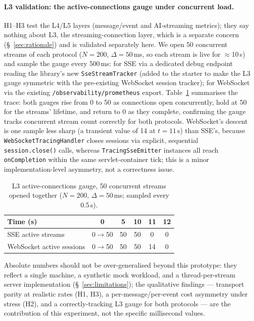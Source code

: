 \documentclass[11pt]{article}
\begin{document}
\paragraph{L3 validation: the active-connections gauge under concurrent load.} H1--H3 test the L4/L5 layers (message/event and AI-streaming metrics); they say nothing about L3, the streaming-connection layer, which is a separate concern (\S~\ref{sec:rationale}) and is validated separately here. We open 50 concurrent streams of each protocol ($N=200$, $\Delta=50$\,ms, so each stream is live for $\approx$10\,s) and sample the gauge every 500\,ms: for SSE via a dedicated debug endpoint reading the library's new \texttt{SseStreamTracker} (added to the starter to make the L3 gauge symmetric with the pre-existing WebSocket session tracker); for WebSocket via the existing \texttt{/observability/prometheus} export. Table~\ref{tab:l3-gauge} summarises the trace: both gauges rise from 0 to 50 as connections open concurrently, hold at 50 for the streams' lifetime, and return to 0 as they complete, confirming the gauge tracks concurrent stream count correctly for both protocols. WebSocket's descent is one sample less sharp (a transient value of 14 at $t=11$\,s) than SSE's, because \texttt{WebSocketTracingHandler} closes sessions via explicit, sequential \texttt{session.close()} calls, whereas \texttt{TracingSseEmitter} instances all reach \texttt{onCompletion} within the same servlet-container tick; this is a minor implementation-level asymmetry, not a correctness issue.

\begin{table}[H]
\centering\small
\caption{L3 active-connections gauge, 50 concurrent streams opened together ($N=200$, $\Delta=50$\,ms; sampled every 0.5\,s).}
\label{tab:l3-gauge}
\begin{tabular}{@{}lccccc@{}}
\toprule
Time (s) & 0 & 5 & 10 & 11 & 12 \\
\midrule
SSE active streams & 0$\to$50 & 50 & 50 & 0 & 0 \\
WebSocket active sessions & 0$\to$50 & 50 & 50 & 14 & 0 \\
\bottomrule
\end{tabular}
\end{table}

Absolute numbers should not be over-generalised beyond this prototype: they reflect a single machine, a synthetic mock workload, and a thread-per-stream server implementation (\S~\ref{sec:limitations}); the qualitative findings --- transport parity at realistic rates (H1, H3), a per-message/per-event cost asymmetry under stress (H2), and a correctly-tracking L3 gauge for both protocols --- are the contribution of this experiment, not the specific millisecond values.
\end{document}
